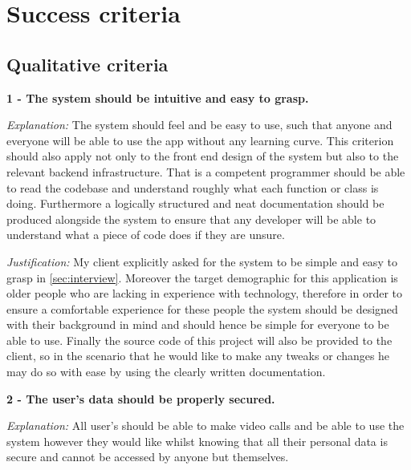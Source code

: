 \section{Success criteria}

\subsection{Qualitative criteria}

\textsf{\bfseries 1 - The system should be intuitive and easy to grasp.}
\vspace{0.1cm}

\textit{Explanation:}
The system should feel and be easy to use, such that anyone
and everyone will be able to use the app without any learning
curve. This criterion should also apply not only to the front
end design of the system but also to the relevant backend 
infrastructure. That is a competent programmer should be able to 
read the codebase and understand roughly what each function or 
class is doing. Furthermore a logically structured and neat 
documentation should be produced alongside the system to 
ensure that any developer will be able to understand what 
a piece of code does if they are unsure.

\vspace{0.1cm}

\textit{Justification:} 
My client explicitly asked for the system to be simple and 
easy to grasp in \ref{sec:interview}. Moreover the target 
demographic for this application is older people who are 
lacking in experience with technology, therefore in order to 
ensure a comfortable experience for these people the system 
should be designed with their background in mind and should
hence be simple for everyone to be able to use. Finally the 
source code of this project will also be provided to the 
client, so in the scenario that he would like to make any 
tweaks or changes he may do so with ease by using the clearly 
written documentation.

\vspace{0.2cm}

\textsf{\bfseries 2 - The user's data should be properly secured.} 

\vspace{0.1cm}

\textit{Explanation:} 
All user's should be able to make video calls and be able to 
use the system however they would like whilst knowing that all
their personal data is secure and cannot be accessed by anyone
but themselves.

